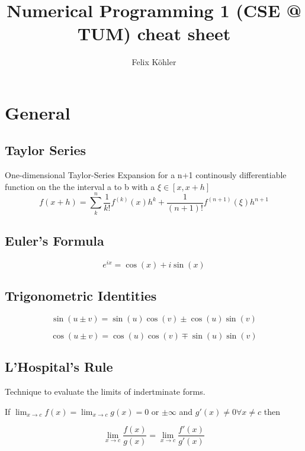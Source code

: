 \documentclass[
    a4paper,
    11pt
]{article}
\author{Felix Köhler}
\title{Numerical Programming 1 (CSE @ TUM) cheat sheet}
\begin{document}
\tableofcontents

\clearpage

\section{General}

\subsection{Taylor Series}

One-dimensional Taylor-Series Expansion for a n+1 continously differentiable
function on the the interval a to b with a $\xi \in [x, x+h]$
\begin{equation}
    f(x+h) = \sum_k^n \frac{1}{k!} f^{(k)}(x)h^k + \frac{1}{(n+1)!}
    f^{(n+1)}(\xi)h^{n+1}
\end{equation}

\subsection{Euler's Formula}

\begin{equation}
    e^{ix} = \cos(x) + i\sin(x)
\end{equation}

\subsection{Trigonometric Identities}

\begin{equation}
    \sin(u \pm v) = \sin(u) \cos(v) \pm \cos(u) \sin(v)
\end{equation}

\begin{equation}
    \cos(u \pm v) = \cos(u) \cos(v) \mp \sin(u) \sin(v)
\end{equation}

\subsection{L'Hospital's Rule}

Technique to evaluate the limits of indertminate forms.

If $\lim_{x\to c} f(x) = \lim_{x\to c}g(x) = 0$ or $\pm \infty$ and $g'(x) \neq 0
\forall x \neq c$ then

\begin{equation}
    \lim_{x\to c} \frac{f(x)}{g(x)} = \lim_{x\to c} \frac{f'(x)}{g'(x)}
\end{equation}
\end{document}
